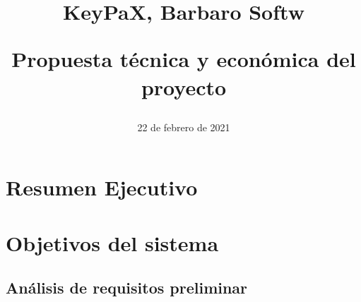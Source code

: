 \documentclass{article}
\title{
\Huge{KeyPaX, Barbaro Softw} \\ 
\begin{Large} 
Propuesta técnica y económica    del proyecto
\end{Large}}
\date{22 de febrero de 2021}
\begin{document}
\maketitle

\pagebreak 

\tableofcontents

\pagebreak

\section{Resumen Ejecutivo}


\pagebreak

\section{Objetivos del sistema}



\subsection{Análisis de requisitos preliminar}


\end{document}
